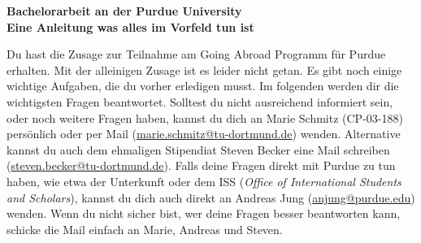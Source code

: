 \documentclass[
  paper=a4,
  fontsize=12pt,
  DIV=16,
  headheight=52pt,
  footheight=45pt,
  headinclude,
  parskip=full,
]{scrartcl}
\date{\today}
\begin{document}
\textbf{\Huge\sffamily Bachelorarbeit an der Purdue University}\\[0.5\baselineskip]
\textbf{\Large\sffamily Eine Anleitung was alles im Vorfeld tun ist}

Du hast die Zusage zur Teilnahme am Going Abroad Programm für Purdue erhalten.
Mit der alleinigen Zusage ist es leider nicht getan.
Es gibt noch einige wichtige Aufgaben, die du vorher erledigen musst.
Im folgenden werden dir die wichtigsten Fragen beantwortet.
Solltest du nicht ausreichend informiert sein, oder noch weitere Fragen haben,
kannst du dich an Marie Schmitz (CP-03-188) persönlich oder per Mail
(\href{mailto:marie.schmitz@tu-dortmund.de}{marie.schmitz@tu-dortmund.de}) wenden.
Alternative kannst du auch dem ehmaligen Stipendiat Steven Becker eine Mail
schreiben (\href{mailto:steven.becker@tu-dortmund.de}{steven.becker@tu-dortmund.de}).
Falls deine Fragen direkt mit Purdue zu tun haben, wie etwa der Unterkunft oder
dem ISS (\textit{Office of International Students and Scholars}), kannst du dich auch direkt an Andreas Jung (\href{mailto:anjung@purdue.edu}{anjung@purdue.edu}) wenden.
Wenn du nicht sicher bist, wer deine Fragen besser beantworten kann, schicke die Mail einfach an Marie, Andreas und Steven.
\end{document}
